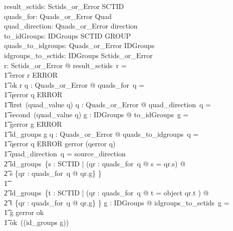 \documentclass{article}
\begin{document}
\begin{gendef}
   result\_sctids: Sctids\_or\_Error \fun \power SCTID \\
   quads\_for: Quads\_or\_Error \fun \power Quad  \\
   quad\_direction: Quads\_or\_Error \pfun direction \\
   to\_idGroups: IDGroups \fun SCTID \fun \power GROUP \\
   quads\_to\_idgroups: Quads\_or\_Error \fun IDGroups \\
   idgroups\_to\_sctids: IDGroups \fun Sctids\_or\_Error \\
\where
   \forall r: Sctids\_or\_Error @ result\_sctids~r = \\
\t1 \IF error \inv r \in ERROR \THEN \emptyset \\
\t1 \ELSE ok \inv r
\also
   \forall q : Quads\_or\_Error @ quads\_for~q = \\
\t1 \IF qerror \inv q \in ERROR \THEN \emptyset \\
\t1 \ELSE first~(quad\_value \inv q)
\also
   \forall q : Quads\_or\_Error @ quad\_direction~q = \\
\t1 second~(quad\_value \inv q)
\also
   \forall g : IDGroups @ to\_idGroups~g = \\
\t1 \IF gerror \inv g \in ERROR \THEN \emptyset \\
\t1 \ELSE id\_groups \inv g
\also
   \forall q : Quads\_or\_Error @ quads\_to\_idgroups~q = \\
\t1 \IF qerror  \inv q \in ERROR \THEN gerror (qerror \inv q) \\
\t1 \ELSE \IF quad\_direction~q = source\_direction \\
\t2 \THEN id\_groups~\{s : SCTID | (\exists qr : quads\_for~q @ s = qr.s) @ \\
\t2 s \mapsto \{qr : quads\_for~q @ qr.g\} \} \\
\t1 \ELSE \\
\t2 id\_groups~\{t : SCTID | (\exists qr : quads\_for~q @ t = object \inv qr.t ) @ \\
\t2 t \mapsto \{qr : quads\_for~q @ qr.g\} \} 
\also
   \forall g : IDGroups @ idgroups\_to\_sctids~g = \\
\t1 \IF g \in \ran gerror \THEN ok~\emptyset \\
\t1 \ELSE ok~(\dom (id\_groups \inv g))
\end{gendef}
\end{document}
